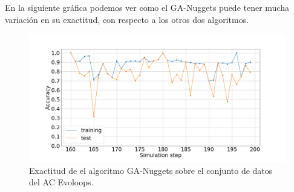 En la siguiente gráfica podemos ver como el GA-Nuggets puede tener mucha variación en su exactitud, con respecto a los otros dos algoritmos.

\begin{figure}[H]
	\centering
	\includegraphics[width=\linewidth]{fig/GA-nuggets_8}
	\caption{Exactitud de el algoritmo GA-Nuggets sobre el conjunto de datos del AC Evoloops.}
	\label{fig:ganuggetsevoloops}
\end{figure}
